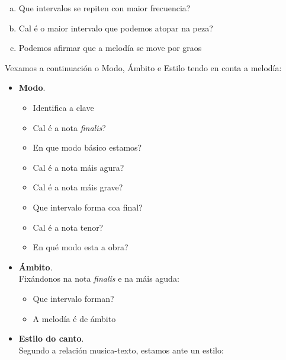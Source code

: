 \begin{multicols}{2}
\begin{enumerate}[1.-]
\begin{enumerate}[a)]
            \item 
            Que intervalos se repiten con maior frecuencia? \dotfill
            \item 
            Cal é o maior intervalo que podemos atopar na peza? \dotfill
            \item
            Podemos afirmar que a melodía se move por graos \dotfill
        \end{enumerate}
        Vexamos a continuación o Modo, Ámbito e Estilo tendo en conta a melodía:
        \begin{itemize}
            \item %
            \textbf{Modo}.
        \begin{itemize}            
            \item 
            Identifica a clave \dotfill
            \item 
            Cal é a nota \textit{finalis}? \dotfill
            \item
            En que modo básico estamos? \dotfill
            \item
            Cal é a nota máis agura? \dotfill 
            \item
            Cal é a nota máis grave? \dotfill 
            \item
            Que intervalo forma coa final? \dotfill
            \item
            Cal é a nota tenor? \dotfill 
            \item
            En qué modo esta a obra? \dotfill
       \end{itemize}
            \item %
            \textbf{Ámbito}. \\
            Fixándonos na nota \textit{finalis} e na máis aguda:
                \begin{itemize}
                    \item
                    Que intervalo forman? \dotfill
                    \item
                    A melodía é de ámbito \dotfill
                \end{itemize}
            \item %
            \textbf{Estilo do canto}. \\ Segundo a relación musica-texto, estamos ante un estilo:
                \begin{enumerate}[a)]

\end{enumerate}
\end{itemize}
\end{enumerate}
\end{multicols}

